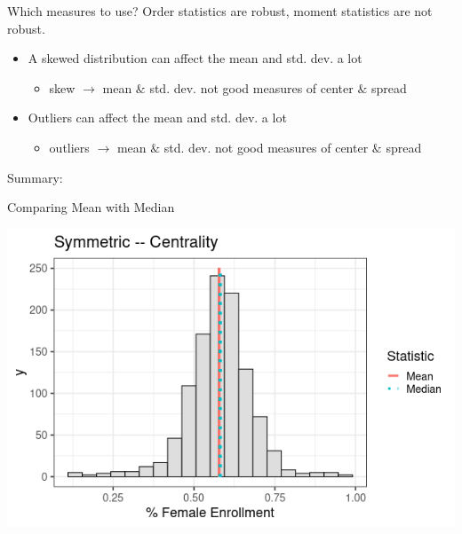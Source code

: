 \documentclass{beamer}
\begin{document}
\begin{frame}{Which measures to use?}
Order statistics are robust, moment statistics are not robust.
\begin{itemize}
    \item A skewed distribution can affect the mean and std. dev. a lot
    \begin{itemize}
        \item skew $\rightarrow$ mean $\&$ std. dev. not good measures of center $\&$ spread
    \end{itemize} \vspace{2mm}
    \item Outliers can affect the mean and std. dev. a lot
    \begin{itemize}
        \item outliers $\rightarrow$ mean $\&$ std. dev. not good measures of center $\&$ spread
    \end{itemize}
\end{itemize} \vspace{4mm}

Summary:
\noindent{}
\end{frame}



\begin{frame}{Comparing Mean with Median}
\begin{center}
\includegraphics[scale=0.5]{center_sym.png}
\end{center}
\end{frame}
\end{document}
